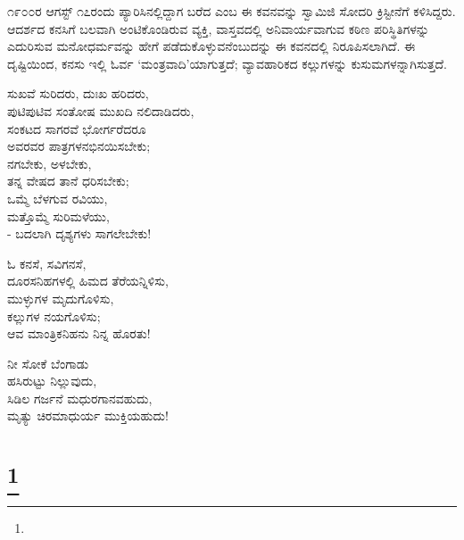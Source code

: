 ೧೯೦೦ರ ಆಗಸ್ಟ್ ೧೭ರಂದು ಪ್ಯಾರಿಸಿನಲ್ಲಿದ್ದಾಗ ಬರೆದ  ಎಂಬ ಈ ಕವನವನ್ನು ಸ್ವಾಮಿಜಿ ಸೋದರಿ ಕ್ರಿಸ್ಟೀನೆಗೆ ಕಳಿಸಿದ್ದರು. ಆದರ್ಶದ ಕನಸಿಗೆ ಬಲವಾಗಿ ಅಂಟಿಕೊಂಡಿರುವ ವ್ಯಕ್ತಿ, ವಾಸ್ತವದಲ್ಲಿ ಅನಿವಾರ್ಯವಾಗುವ ಕಠಿಣ ಪರಿಸ್ಥಿತಿಗಳನ್ನು ಎದುರಿಸುವ ಮನೋಧರ್ಮವನ್ನು ಹೇಗೆ ಪಡೆದುಕೊಳ್ಳುವನೆಂಬುದನ್ನು ಈ ಕವನದಲ್ಲಿ ನಿರೂಪಿಸಲಾಗಿದೆ. ಈ ದೃಷ್ಟಿಯಿಂದ, ಕನಸು ಇಲ್ಲಿ ಓರ್ವ ‘ಮಂತ್ರವಾದಿ’ಯಾಗುತ್ತದೆ; ವ್ಯಾವಹಾರಿಕದ ಕಲ್ಲುಗಳನ್ನು ಕುಸುಮಗಳನ್ನಾಗಿಸುತ್ತದೆ.

\begin{myquote}
ಸುಖವೆ ಸುರಿದರು, ದುಃಖ ಹರಿದರು,\\ಪುಟಿಪುಟಿವ ಸಂತೋಷ ಮುಖದಿ ನಲಿದಾಡಿದರು,\\ಸಂಕಟದ ಸಾಗರವೆ ಭೋರ್ಗರೆದರೂ\\ಅವರವರ ಪಾತ್ರಗಳನಭಿನಯಿಸಬೇಕು;\\ನಗಬೇಕು, ಅಳಬೇಕು,\\ತನ್ನ ವೇಷದ ತಾನೆ ಧರಿಸಬೇಕು;\\ಒಮ್ಮೆ ಬೆಳಗುವ ರವಿಯು,\\ಮತ್ತೊಮ್ಮೆ ಸುರಿಮಳೆಯು,\\- ಬದಲಾಗಿ ದೃಶ್ಯಗಳು ಸಾಗಲೇಬೇಕು!
\end{myquote}

\begin{myquote}
ಓ ಕನಸೆ, ಸವಿಗನಸೆ,\\ದೂರಸನಿಹಗಳಲ್ಲಿ ಹಿಮದ ತೆರೆಯನ್ನಿಳಿಸು,\\ಮುಳ್ಳುಗಳ ಮೃದುಗೊಳಿಸು,\\ಕಲ್ಲುಗಳ ನಯಗೊಳಿಸು;\\ಆವ ಮಾಂತ್ರಿಕನಿಹನು ನಿನ್ನ ಹೊರತು!
\end{myquote}

\begin{myquote}
ನೀ ಸೋಕೆ ಬೆಂಗಾಡು\\ಹಸಿರುಟ್ಟು ನಿಲ್ಲುವುದು,\\ಸಿಡಿಲ ಗರ್ಜನೆ ಮಧುರಗಾನವಹುದು,\\ಮೃತ್ಯು ಚಿರಮಾಧುರ್ಯ ಮುಕ್ತಿಯಹುದು!
\end{myquote}

\selecteng

\chapter[LIGHT]{\protect\footnote{}}

\begin{myquote}
\end{myquote}

